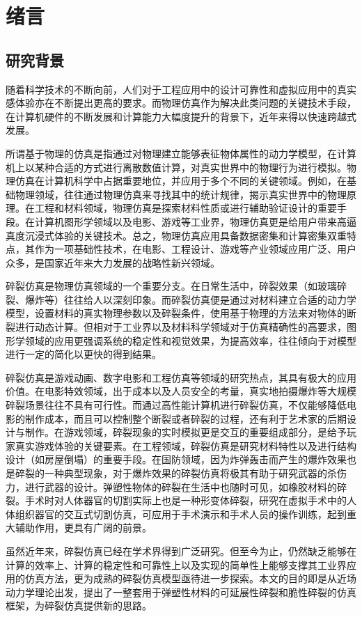 \chapter{绪言}
\label{chap1_introduction}
\section{研究背景}
随着科学技术的不断向前，人们对于工程应用中的设计可靠性和虚拟应用中的真实感体验亦在不断提出更高的要求。而物理仿真作为解决此类问题的关键技术手段，在计算机硬件的不断发展和计算能力大幅度提升的背景下，近年来得以快速跨越式发展。

所谓基于物理的仿真是指通过对物理建立能够表征物体属性的动力学模型，在计算机上以某种合适的方式进行离散数值计算，对真实世界中的物理行为进行模拟。物理仿真在计算机科学中占据重要地位，并应用于多个不同的关键领域。例如，在基础物理领域，往往通过物理仿真来寻找其中的统计规律，揭示真实世界中的物理原理。在工程和材料领域，物理仿真是探索材料性质或进行辅助验证设计的重要手段。在计算机图形学领域以及电影、游戏等工业界，物理仿真更是给用户带来高逼真度沉浸式体验的关键技术。总之，物理仿真应用具备数据密集和计算密集双重特点，其作为一项基础性技术，在电影、工程设计、游戏等产业领域应用广泛、用户众多，是国家近年来大力发展的战略性新兴领域。

碎裂仿真是物理仿真领域的一个重要分支。在日常生活中，碎裂效果（如玻璃碎裂、爆炸等）往往给人以深刻印象。而碎裂仿真便是通过对材料建立合适的动力学模型，设置材料的真实物理参数以及碎裂条件，使用基于物理的方法来对物体的断裂进行动态计算。但相对于工业界以及材料科学领域对于仿真精确性的高要求，图形学领域的应用更强调系统的稳定性和视觉效果，为提高效率，往往倾向于对模型进行一定的简化以更快的得到结果。

碎裂仿真是游戏动画、数字电影和工程仿真等领域的研究热点，其具有极大的应用价值。在电影特效领域，出于成本以及人员安全的考量，真实地拍摄爆炸等大规模碎裂场景往往不具有可行性。而通过高性能计算机进行碎裂仿真，不仅能够降低电影的制作成本，而且可以控制整个断裂或者碎裂的过程，还有利于艺术家的后期设计与制作。在游戏领域，碎裂现象的实时模拟更是交互的重要组成部分，是给予玩家真实游戏体验的关键要素。在工程领域，碎裂仿真是研究材料特性以及进行结构设计（如房屋倒塌）的重要手段。在国防领域，因为炸弹轰击而产生的爆炸效果也是碎裂的一种典型现象，对于爆炸效果的碎裂仿真将极其有助于研究武器的杀伤力，进行武器的设计。弹塑性物体的碎裂在生活中也随时可见，如橡胶材料的碎裂。手术时对人体器官的切割实际上也是一种形变体碎裂，研究在虚拟手术中的人体组织器官的交互式切割仿真，可应用于手术演示和手术人员的操作训练，起到重大辅助作用，更具有广阔的前景。

虽然近年来，碎裂仿真已经在学术界得到广泛研究。但至今为止，仍然缺乏能够在计算的效率上、计算的稳定性和可靠性上以及实现的简单性上能够支撑其工业界应用的仿真方法，更为成熟的碎裂仿真模型亟待进一步探索。本文的目的即是从近场动力学理论出发，提出了一整套用于弹塑性材料的可延展性碎裂和脆性碎裂的仿真框架，为碎裂仿真提供新的思路。


